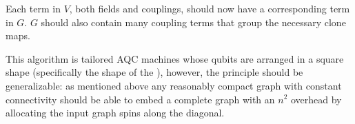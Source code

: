 Each term in $V$, both fields and couplings, should now have a corresponding term in $G$.  $G$ should also contain many coupling terms that group the necessary clone maps.  

This algorithm is tailored AQC machines whose qubits are arranged in a square shape (specifically the shape of the \machine), however, the principle should be generalizable: as mentioned above any reasonably compact graph with constant connectivity should be able to embed a complete graph with an $n^2$ overhead by allocating the input graph spins along the diagonal.
